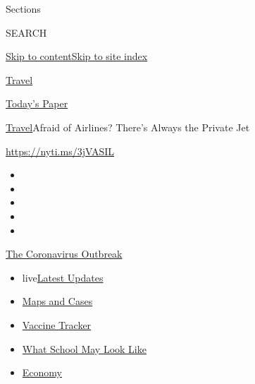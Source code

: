 Sections

SEARCH

\protect\hyperlink{site-content}{Skip to
content}\protect\hyperlink{site-index}{Skip to site index}

\href{https://www.nytimes.com/section/travel}{Travel}

\href{https://myaccount.nytimes.com/auth/login?response_type=cookie\&client_id=vi}{}

\href{https://www.nytimes.com/section/todayspaper}{Today's Paper}

\href{/section/travel}{Travel}\textbar{}Afraid of Airlines? There's
Always the Private Jet

\url{https://nyti.ms/3jVASIL}

\begin{itemize}
\item
\item
\item
\item
\item
\end{itemize}

\href{https://www.nytimes.com/news-event/coronavirus?action=click\&pgtype=Article\&state=default\&region=TOP_BANNER\&context=storylines_menu}{The
Coronavirus Outbreak}

\begin{itemize}
\tightlist
\item
  live\href{https://www.nytimes.com/2020/08/01/world/coronavirus-covid-19.html?action=click\&pgtype=Article\&state=default\&region=TOP_BANNER\&context=storylines_menu}{Latest
  Updates}
\item
  \href{https://www.nytimes.com/interactive/2020/us/coronavirus-us-cases.html?action=click\&pgtype=Article\&state=default\&region=TOP_BANNER\&context=storylines_menu}{Maps
  and Cases}
\item
  \href{https://www.nytimes.com/interactive/2020/science/coronavirus-vaccine-tracker.html?action=click\&pgtype=Article\&state=default\&region=TOP_BANNER\&context=storylines_menu}{Vaccine
  Tracker}
\item
  \href{https://www.nytimes.com/interactive/2020/07/29/us/schools-reopening-coronavirus.html?action=click\&pgtype=Article\&state=default\&region=TOP_BANNER\&context=storylines_menu}{What
  School May Look Like}
\item
  \href{https://www.nytimes.com/live/2020/07/31/business/stock-market-today-coronavirus?action=click\&pgtype=Article\&state=default\&region=TOP_BANNER\&context=storylines_menu}{Economy}
\end{itemize}

